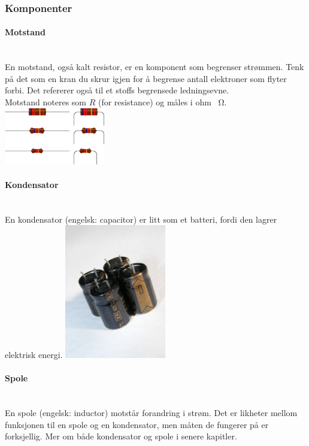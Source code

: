 \subsubsection{Komponenter}
\paragraph{Motstand} \mbox{} \\
En motstand, også kalt resistor, er en komponent som begrenser strømmen.
Tenk på det som en kran du skrur igjen for å begrense antall elektroner som flyter forbi.
Det refererer også til et stoffs begrensede ledningsevne.
\\
Motstand noteres som $R$ (for resistance) og måles i ohm \SI{}{\ohm}.
\\
\includegraphics[width=0.33\textwidth]{./img/resistor}

\paragraph{Kondensator} \mbox{} \\
En kondensator (engelsk: capacitor) er litt som et batteri,
fordi den lagrer elektrisk energi.
\includegraphics[width=0.33\textwidth]{./img/kondensator}

\paragraph{Spole} \mbox{} \\
En spole (engelsk: inductor) motstår forandring i strøm.
Det er likheter mellom funksjonen til en spole og en kondensator, men måten de fungerer på er forksjellig.
Mer om både kondensator og spole i senere kapitler.
